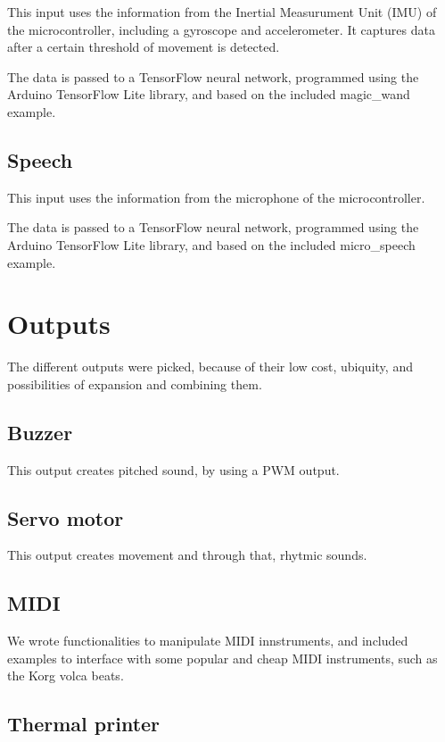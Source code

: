 This input uses the information from the Inertial Measurument Unit (IMU) of the microcontroller, including a gyroscope and accelerometer. It captures data after a certain threshold of movement is detected.

The data is passed to a TensorFlow neural network, programmed using the Arduino TensorFlow Lite library, and based on the included magic_wand example.

\subsection{Speech}

This input uses the information from the microphone of the microcontroller.

The data is passed to a TensorFlow neural network, programmed using the Arduino TensorFlow Lite library, and based on the included micro_speech example.

\section{Outputs}

The different outputs were picked, because of their low cost, ubiquity, and possibilities of expansion and combining them.

\subsection{Buzzer}

This output creates pitched sound, by using a PWM output.

\subsection{Servo motor}

This output creates movement and through that, rhytmic sounds.

\subsection{MIDI}

We wrote functionalities to manipulate MIDI innstruments, and included examples to interface with some popular and cheap MIDI instruments, such as the Korg volca beats.

\subsection{Thermal printer}

